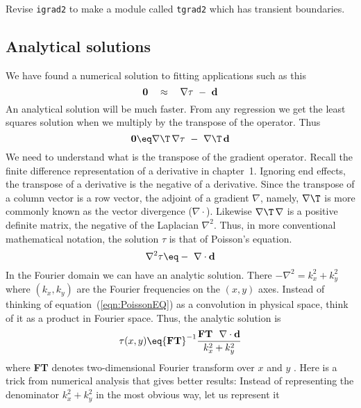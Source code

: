 Revise \texttt{igrad2} to make a module called {\tt tgrad2}
which has transient boundaries.


\subsection{Analytical solutions}
%
We have found a numerical solution to fitting applications such as this 
\begin{equation}
{\bf 0} \quad \approx \quad \nabla \tau \ - \ {\bf d}
\label{eqn:analyticsolution}
\end{equation}
An analytical solution will be much faster.
From any regression we get the least 
squares solution when we multiply by the transpose of the operator. Thus 
\begin{equation}
{\bf 0} \eq \nabla\T\,\nabla \tau \ -\ \nabla\T\,{\bf d}
\end{equation} 
We need to understand what is the transpose of the gradient operator.
Recall the finite difference representation of a derivative in chapter~1.
Ignoring end effects,
the transpose of a derivative is the negative of a derivative.
Since the transpose of a column vector is a row vector,
the adjoint of a gradient $\nabla$, namely,
$\nabla\T$ is more commonly known as the vector divergence 
($\nabla \cdot$).
Likewise $\nabla\T\,\nabla$ is a positive definite matrix,
the negative of the Laplacian $\nabla^2$.
Thus, in more conventional mathematical notation,
the solution $\tau$ is that of Poisson's equation. 
\begin{equation}
\nabla^2 \tau \eq - \ \nabla \cdot {\bf d} 
\label{eqn:PoissonEQ}
\end{equation} 
In the Fourier domain we can have an analytic solution.
There $-\nabla^2 = k_x^2 + k_y^2$ 
where $(k_x , k_y)$ are the Fourier frequencies on the $(x , y )$ axes.
Instead of thinking 
of equation~(\ref{eqn:PoissonEQ}) as a convolution in physical space,
think of it as a product in Fourier space.
Thus, the analytic solution is
\begin{equation}
\tau(x,y) \eq
{\bf FT}^{-1} \frac{ {\bf FT} \ \ \nabla \cdot {\bf d} } { k_x^2+k_y^2}
\end{equation}
where {\bf FT} denotes two-dimensional Fourier transform over $x$ and $y$ . 
Here is a trick from numerical analysis that gives better results: Instead of 
representing the denominator $k_x^2+k_y^2$ in the most obvious way, let us represent it 
